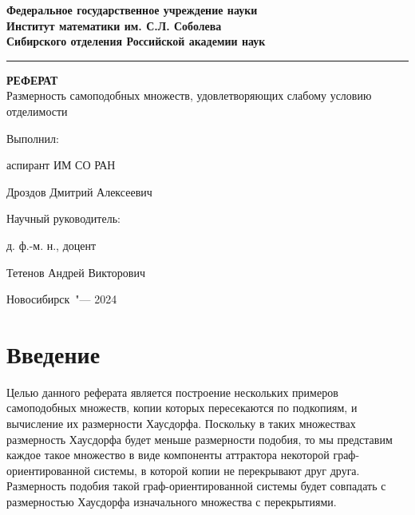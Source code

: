 \documentclass[a4paper,14pt]{extarticle} %
\newcommand{\0}{\varnothing}
\newcommand{\8}{\infty}
\theoremstyle{definition}
\begin{document}
\thispagestyle{empty}
\begin{center}
\textbf{
Федеральное государственное учреждение науки\\
Институт математики им. С.Л. Соболева\\
Сибирского отделения Российской академии наук}
\end{center}

\noindent\rule{\textwidth}{1pt} %

\vspace{0pt plus4fill}


\begin{center}
\textbf {\large %
РЕФЕРАТ}\\
{\large Размерность самоподобных множеств, удовлетворяющих слабому условию отделимости}
\end{center}

\vspace{0pt plus4fill}

\noindent 
\hspace{8cm} Выполнил:

\hspace{8cm} аспирант ИМ СО РАН

\hspace{8cm} Дроздов Дмитрий Алексеевич


\vspace{0pt plus1fill}

\noindent 
\hspace{8cm} Научный руководитель:

\hspace{8cm} д. ф.-м. н., доцент

\hspace{8cm} Тетенов Андрей Викторович


\vspace{0pt plus4fill}
{\centering Новосибирск\ "--- 2024\par}

\newpage
\thispagestyle{empty}
\tableofcontents

\newpage
\section*{Введение}


Целью данного реферата является построение нескольких примеров самоподобных множеств, копии которых пересекаются по подкопиям, и вычисление их размерности Хаусдорфа.
Поскольку в таких множествах размерность Хаусдорфа будет меньше размерности подобия, то мы представим каждое такое множество в виде компоненты аттрактора некоторой граф-ориентированной системы, в которой копии не перекрывают друг друга.
Размерность подобия такой граф-ори\-ен\-ти\-ро\-ван\-ной системы будет совпадать с размерностью Хаусдорфа изначального множества с перекрытиями.
\end{document}
